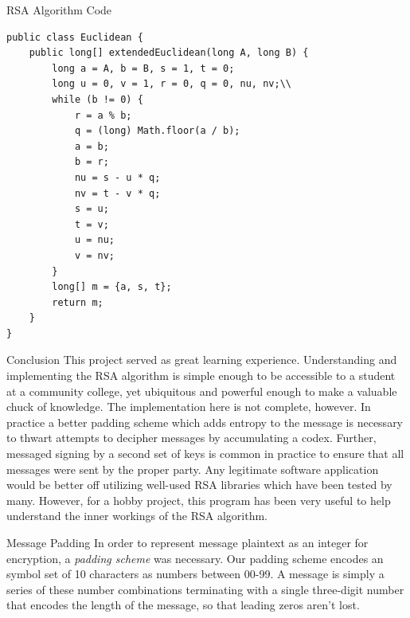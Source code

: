 \documentclass[landscape,fontscale=.4,paperwidth=48in,paperheight=36in]{baposter} %
\begin{document}
\begin{poster}
\begin{posterbox}[name=code,column=30,span=28,row=0]{RSA Algorithm Code}
{\begin{verbatim}
public class Euclidean {
    public long[] extendedEuclidean(long A, long B) {
        long a = A, b = B, s = 1, t = 0;
        long u = 0, v = 1, r = 0, q = 0, nu, nv;\\
        while (b != 0) {
            r = a % b;
            q = (long) Math.floor(a / b);
            a = b;
            b = r;
            nu = s - u * q;
            nv = t - v * q;
            s = u;
            t = v;
            u = nu;
            v = nv;
        }
        long[] m = {a, s, t};
        return m;
    }
}
\end{verbatim}}

\end{posterbox}





\begin{posterbox}[name=conclusion, column=30, below=code, span=14]{Conclusion} 
This project served as great learning experience. Understanding and implementing the RSA algorithm is simple enough to be accessible to a student at a community college, yet ubiquitous and powerful enough to make a valuable chuck of knowledge. The implementation here is not complete, however. In practice a better padding scheme which adds entropy to the message is necessary to thwart attempts to decipher messages by accumulating a codex. Further, messaged signing by a second set of keys is common in practice to ensure that all messages were sent by the proper party. Any legitimate software application would be better off utilizing well-used RSA libraries which have been tested by many. However, for a hobby project, this program has been very useful to help understand the inner workings of the RSA algorithm.
\end{posterbox}



\begin{posterbox}[name=padding, column=44, below=code, span=14]{Message Padding}
In order to represent message plaintext as an integer for encryption, a \emph{padding scheme} was necessary. Our padding scheme encodes an symbol set of 10 characters as numbers between 00-99. A message is simply a series of these number combinations terminating with a single three-digit number that encodes the length of the message, so that leading zeros aren't lost.
\end{posterbox}




\end{poster}
\end{document}
